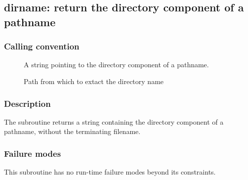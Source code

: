 \clearpage
{}
{}
\label{subr:dirname}
\subsection*{dirname: return the directory component of a pathname}

\subsubsection*{Calling convention}

\begin{description}
\item[] A string pointing to the directory component of
  a pathname.
\item[] Path from which to extact the directory name
\end{description}

\subsubsection*{Description}

The  subroutine returns a string containing the
directory component of a pathname, without the terminating filename.

\subsubsection*{Failure modes}

This subroutine has no run-time failure modes beyond its constraints.
